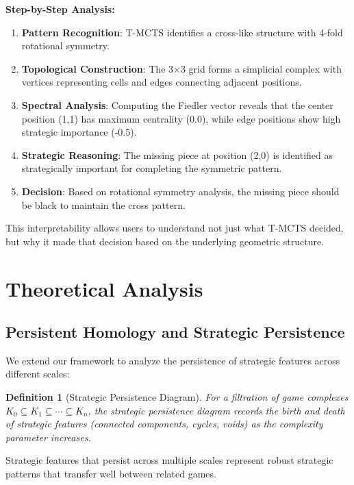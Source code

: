 \documentclass{article}
\newtheorem{definition}{Definition}
\begin{document}
\textbf{Step-by-Step Analysis:}

\begin{enumerate}
\item \textbf{Pattern Recognition}: T-MCTS identifies a cross-like structure with 4-fold rotational symmetry.
\item \textbf{Topological Construction}: The 3×3 grid forms a simplicial complex with vertices representing cells and edges connecting adjacent positions.
\item \textbf{Spectral Analysis}: Computing the Fiedler vector reveals that the center position (1,1) has maximum centrality (0.0), while edge positions show high strategic importance (-0.5).
\item \textbf{Strategic Reasoning}: The missing piece at position (2,0) is identified as strategically important for completing the symmetric pattern.
\item \textbf{Decision}: Based on rotational symmetry analysis, the missing piece should be black to maintain the cross pattern.
\end{enumerate}

This interpretability allows users to understand not just what T-MCTS decided, but why it made that decision based on the underlying geometric structure.

\section{Theoretical Analysis}

\subsection{Persistent Homology and Strategic Persistence}

We extend our framework to analyze the persistence of strategic features across different scales:

\begin{definition}[Strategic Persistence Diagram]
For a filtration of game complexes $K_0 \subseteq K_1 \subseteq \cdots \subseteq K_n$, the strategic persistence diagram records the birth and death of strategic features (connected components, cycles, voids) as the complexity parameter increases.
\end{definition}

Strategic features that persist across multiple scales represent robust strategic patterns that transfer well between related games.
\end{document}

